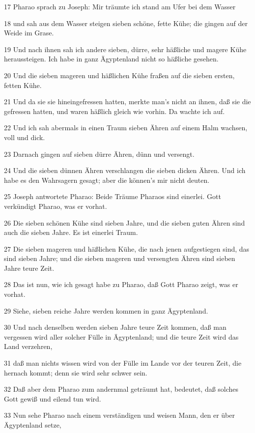 \par 17 Pharao sprach zu Joseph: Mir träumte ich stand am Ufer bei dem Wasser
\par 18 und sah aus dem Wasser steigen sieben schöne, fette Kühe; die gingen auf der Weide im Grase.
\par 19 Und nach ihnen sah ich andere sieben, dürre, sehr häßliche und magere Kühe heraussteigen. Ich habe in ganz Ägyptenland nicht so häßliche gesehen.
\par 20 Und die sieben mageren und häßlichen Kühe fraßen auf die sieben ersten, fetten Kühe.
\par 21 Und da sie sie hineingefressen hatten, merkte man's nicht an ihnen, daß sie die gefressen hatten, und waren häßlich gleich wie vorhin. Da wachte ich auf.
\par 22 Und ich sah abermals in einen Traum sieben Ähren auf einem Halm wachsen, voll und dick.
\par 23 Darnach gingen auf sieben dürre Ähren, dünn und versengt.
\par 24 Und die sieben dünnen Ähren verschlangen die sieben dicken Ähren. Und ich habe es den Wahrsagern gesagt; aber die können's mir nicht deuten.
\par 25 Joseph antwortete Pharao: Beide Träume Pharaos sind einerlei. Gott verkündigt Pharao, was er vorhat.
\par 26 Die sieben schönen Kühe sind sieben Jahre, und die sieben guten Ähren sind auch die sieben Jahre. Es ist einerlei Traum.
\par 27 Die sieben mageren und häßlichen Kühe, die nach jenen aufgestiegen sind, das sind sieben Jahre; und die sieben mageren und versengten Ähren sind sieben Jahre teure Zeit.
\par 28 Das ist nun, wie ich gesagt habe zu Pharao, daß Gott Pharao zeigt, was er vorhat.
\par 29 Siehe, sieben reiche Jahre werden kommen in ganz Ägyptenland.
\par 30 Und nach denselben werden sieben Jahre teure Zeit kommen, daß man vergessen wird aller solcher Fülle in Ägyptenland; und die teure Zeit wird das Land verzehren,
\par 31 daß man nichts wissen wird von der Fülle im Lande vor der teuren Zeit, die hernach kommt; denn sie wird sehr schwer sein.
\par 32 Daß aber dem Pharao zum andernmal geträumt hat, bedeutet, daß solches Gott gewiß und eilend tun wird.
\par 33 Nun sehe Pharao nach einem verständigen und weisen Mann, den er über Ägyptenland setze,

